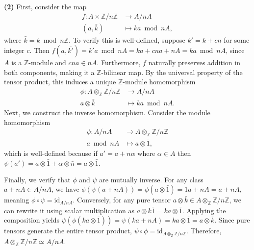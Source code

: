 \begin{solution}
     \textbf{(2)} First, consider the map
     \begin{align*}
        f: A \times \mathbb{Z}/n\mathbb{Z} &\to A/nA \\
        (a, \bar{k}) &\mapsto ka\bmod nA,
     \end{align*} 
    where $\bar{k} = k\bmod n\mathbb{Z}$. To verify this is well-defined, suppose $k' = k + cn$ for some integer $c$. Then $f(a,\bar{k'}) = k'a \bmod nA = ka + cna + nA=ka\bmod nA $, since $A$ is a $\mathbb{Z}$-module and $cna \in nA$.
    Furthermore, $f$ naturally preserves addition in both components, making it a $\mathbb{Z}$-bilinear map. 
    By the universal property of the tensor product, this induces a unique $\mathbb{Z}$-module homomorphism 
    \begin{align*}
        \phi: A \otimes_{\mathbb{Z}} \mathbb{Z}/n\mathbb{Z} &\to A/nA \\
        a \otimes \bar{k} &\mapsto ka \bmod nA.
    \end{align*}
    Next, we construct the inverse homomorphism. 
    Consider the module homomorphism
    \begin{align*}
        \psi:A/nA &\to A \otimes_{\mathbb{Z}} \mathbb{Z}/n\mathbb{Z}\\
        a \bmod nA&\mapsto a \otimes \bar{1},
    \end{align*}
    which is well-defined because if $a'=a+n\alpha$ where $\alpha\in A$ then $\psi(a') = a \otimes \bar{1} + \alpha \otimes \bar{n} = a \otimes \bar{1}$. 

    Finally, we verify that $\phi$ and $\psi$ are mutually inverse. 
    For any class $a + nA \in A/nA$, we have $\phi(\psi(a + nA)) = \phi(a \otimes \bar{1}) = 1a + nA = a + nA$, meaning $\phi \circ \psi = \text{id}_{A/nA}$. Conversely, for any pure tensor $a \otimes \bar{k} \in A \otimes_{\mathbb{Z}} \mathbb{Z}/n\mathbb{Z}$, we can rewrite it using scalar multiplication as $a \otimes k\bar{1} = ka \otimes \bar{1}$. Applying the composition yields $\psi(\phi(ka \otimes \bar{1})) = \psi(ka + nA) = ka \otimes \bar{1} = a \otimes \bar{k}$. Since pure tensors generate the entire tensor product, $\psi \circ \phi = \text{id}_{A \otimes_{\mathbb{Z}} \mathbb{Z}/n\mathbb{Z}}$. Therefore, $A \otimes_{\mathbb{Z}} \mathbb{Z}/n\mathbb{Z} \simeq A/nA$.


\end{solution}
